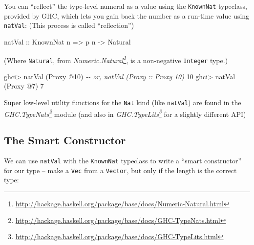 \documentclass[]{article}
\newenvironment{Shaded}{}{}
\newcommand{\CommentTok}[1]{\textcolor[rgb]{0.38,0.63,0.69}{\textit{#1}}}
\newcommand{\DataTypeTok}[1]{\textcolor[rgb]{0.56,0.13,0.00}{#1}}
\newcommand{\DecValTok}[1]{\textcolor[rgb]{0.25,0.63,0.44}{#1}}
\newcommand{\NormalTok}[1]{#1}
\newcommand{\OperatorTok}[1]{\textcolor[rgb]{0.40,0.40,0.40}{#1}}
\newcommand{\OtherTok}[1]{\textcolor[rgb]{0.00,0.44,0.13}{#1}}
\renewcommand{\href}[2]{#2\footnote{\url{#1}}}
\begin{document}
You can ``reflect'' the type-level numeral as a value using the
\texttt{KnownNat} typeclass, provided by GHC, which lets you gain back the
number as a run-time value using \texttt{natVal}: (This process is called
``reflection'')

\begin{Shaded}
\begin{Highlighting}[]
\OtherTok{natVal ::} \DataTypeTok{KnownNat}\NormalTok{ n }\OtherTok{=\textgreater{}}\NormalTok{ p n }\OtherTok{{-}\textgreater{}} \DataTypeTok{Natural}
\end{Highlighting}
\end{Shaded}

(Where \texttt{Natural}, from
\emph{\href{http://hackage.haskell.org/package/base/docs/Numeric-Natural.html}{Numeric.Natural}},
is a non-negative \texttt{Integer} type.)

\begin{Shaded}
\begin{Highlighting}[]
\NormalTok{ghci}\OperatorTok{\textgreater{}}\NormalTok{ natVal (}\DataTypeTok{Proxy} \OperatorTok{@}\DecValTok{10}\NormalTok{)   }\CommentTok{{-}{-} or, natVal (Proxy :: Proxy 10)}
\DecValTok{10}
\NormalTok{ghci}\OperatorTok{\textgreater{}}\NormalTok{ natVal (}\DataTypeTok{Proxy} \OperatorTok{@}\DecValTok{7}\NormalTok{)}
\DecValTok{7}
\end{Highlighting}
\end{Shaded}

Super low-level utility functions for the \texttt{Nat} kind (like
\texttt{natVal}) are found in the
\emph{\href{http://hackage.haskell.org/package/base/docs/GHC-TypeNats.html}{GHC.TypeNats}}
module (and also in
\emph{\href{http://hackage.haskell.org/package/base/docs/GHC-TypeLits.html}{GHC.TypeLits}}
for a slightly different API)

\subsection{The Smart Constructor}\label{the-smart-constructor}

We can use \texttt{natVal} with the \texttt{KnownNat} typeclass to write a
``smart constructor'' for our type -- make a \texttt{Vec} from a
\texttt{Vector}, but only if the length is the correct type:
\end{document}
